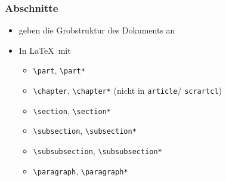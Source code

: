 \begin{frame}[fragile]
  \frametitle{Abschnitte}

  \begin{itemize}
    \item<+-> geben die Grobstruktur des Dokuments an
    \item<+-> In \LaTeX\ mit
      \begin{itemize}
        \item \lstinline!\part!, \lstinline!\part*!
        \item \lstinline!\chapter!, \lstinline!\chapter*!
          (nicht in \lstinline!article!/ \lstinline!scrartcl!)
        \item \lstinline!\section!, \lstinline!\section*!
        \item \lstinline!\subsection!, \lstinline!\subsection*!
        \item \lstinline!\subsubsection!, \lstinline!\subsubsection*!
        \item \lstinline!\paragraph!, \lstinline!\paragraph*!

\end{itemize}
\end{itemize}
\end{frame}
